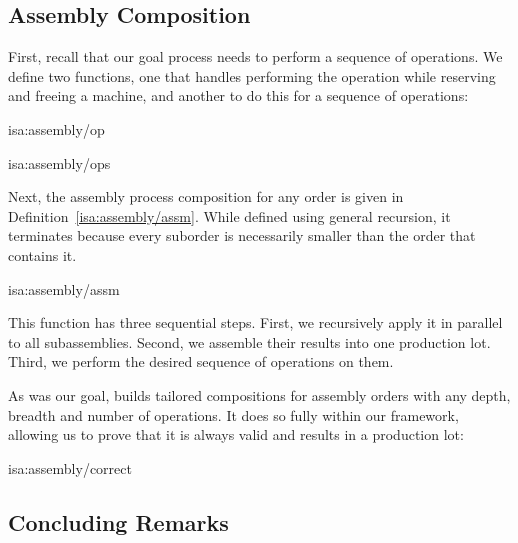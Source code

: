 \documentclass[class=smolathesis,crop=false]{standalone}
\begin{document}
\subsection{Assembly Composition}
\label{sec:cases/assembly/comp}

First, recall that our goal process needs to perform a sequence of operations.
We define two functions, one that handles performing the operation while reserving and freeing a machine, and another to do this for a sequence of operations:
\begin{isadef}{isa:assembly/op}
  
\end{isadef}
\begin{isadef}{isa:assembly/ops}
  
\end{isadef}

Next, the assembly process composition for any order is given in Definition~\ref{isa:assembly/assm}.
While defined using general recursion, it terminates because every suborder is necessarily smaller than the order that contains it.
\begin{isadef}{isa:assembly/assm}
  
\end{isadef}

This function has three sequential steps.
First, we recursively apply it in parallel to all subassemblies.
Second, we assemble their results into one production lot.
Third, we perform the desired sequence of operations on them.

As was our goal,  builds tailored compositions for assembly orders with any depth, breadth and number of operations.
It does so fully within our framework, allowing us to prove that it is always valid and results in a production lot:
\begin{isalemma}{isa:assembly/correct}
  
\end{isalemma}

\subsection{Concluding Remarks}
\label{sec:cases/assembly/conc}
\end{document}
